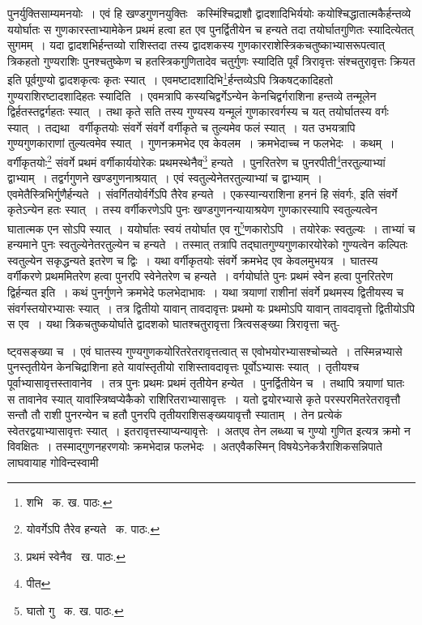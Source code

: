 \documentclass[11pt, openany]{book}
\begin{document}
{\noindent पुनर्युक्तिसाम्यमनयोः~। एवं हि खण्डगुणनयुक्तिः \textendash\ कस्मिंश्चिद्राशौ द्वादशादिभिर्ययोः कयोश्चिद्धातात्मकैर्हन्तव्ये ययोर्घातः स गुणकारस्ताभ्यामेकेन प्रथमं हत्वा हत एव पुनर्द्वितीयेन च हन्यते तदा तयोर्घातगुणितः स्यादित्येतत् सुगमम्~। यदा द्वादशभिर्हन्तव्यो राशिस्तदा तस्य द्वादशकस्य गुणकारराशेस्त्रिकचतुष्काभ्यासरूपत्वात् त्रिकहतो गुण्यराशिः पुनश्चतुष्केण च हतस्त्रिकगुणितादेव चतुर्गुणः स्यादिति पूर्वं त्रिरावृत्तः संश्चतुरावृत्तः क्रियत इति पूर्वगुण्यो द्वादशकृत्वः कृतः स्यात्~। एवमष्टादशादिभि\renewcommand{\thefootnote}{१}\footnote{शभि \textendash\ क. ख. पाठः.}र्हन्तव्येऽपि त्रिकषट्कादिहतो गुण्यराशिरष्टादशादिहतः स्यादिति~। एवमत्रापि कस्यचिद्वर्गेऽन्येन केनचिद्वर्गराशिना हन्तव्ये तन्मूलेन द्विर्हतस्तद्वर्गहतः स्यात्~। तथा कृते सति तस्य गुण्यस्य यन्मूलं गुणकारवर्गस्य च यत् तयोर्घातस्य वर्गः स्यात्~। तद्यथा \textendash\ वर्गीकृतयोः संवर्गे संवर्गे
वर्गीकृते च तुल्यमेव फलं स्यात्~। यत उभयत्रापि गुण्यगुणकाराणां तुल्यत्वमेव स्यात्~। गुणनक्रमभेद एव केवलम~। क्रमभेदाच्च न फलभेदः~। कथम्~। वर्गीकृतयोः\renewcommand{\thefootnote}{२}\footnote{योवर्गेऽपि तैरेव हन्यते \textendash\ क. पाठः.}   संवर्गे प्रथमं वर्गीकार्ययोरेकः प्रथमस्थेनैव\renewcommand{\thefootnote}{३}\footnote{प्रथमं स्वेनैव \textendash\ ख. पाठः.} हन्यते~। पुनरितरेण च पुनरपीती\renewcommand{\thefootnote}{४}\footnote{पीत}तरतुल्याभ्यां द्वाभ्याम्~। तद्वर्गगुणने खण्डगुणनाश्रयात्~। एवं स्वतुल्येनेतरतुल्याभ्यां च द्वाभ्याम्~। एवमेतैस्त्रिभिर्गुणैर्हन्यते~। संवर्गितयोर्वर्गेऽपि तैरेव हन्यते~। एकस्यान्यराशिना हननं हि संवर्गः, इति संवर्गे कृतेऽन्येन हतः स्यात्~। तस्य वर्गीकरणेऽपि पुनः खण्डगुणनन्यायाश्रयेण गुणकारस्यापि स्वतुल्यत्वेन घातात्मक एन सोऽपि स्यात्~। ययोर्घातः स्वयं तयोर्घात एव गु\renewcommand{\thefootnote}{५}\footnote{घातो गु \textendash\ क. ख. पाठः.}णकारोऽपि~। तयोरेकः स्वतुल्यः~। ताभ्यां च हन्यमाने पुनः स्वतुल्येनेतरतुल्येन च हन्यते~। तस्मात् तत्रापि तद्घातगुण्यगुणकारयोरेको गुण्यत्वेन कल्पितः स्वतुल्येन सकृद्धन्यते इतरेण च द्विः~। यथा वर्गीकृतयोः संवर्गे क्रमभेद एव केवलमुभयत्र~। घातस्य वर्गीकरणे प्रथममितरेण हत्वा पुनरपि स्वेनेतरेण च हन्यते~। वर्गयोर्घाते पुनः प्रथमं स्वेन हत्वा पुनरितरेण द्विर्हन्यत इति~। कथं पुनर्गुणने क्रमभेदे फलभेदाभावः~। यथा त्रयाणां राशीनां संवर्गे प्रथमस्य द्वितीयस्य च संवर्गस्तयोरभ्यासः स्यात्~। तत्र द्वितीयो यावान् तावदावृत्तः प्रथमो यः प्रथमोऽपि यावान् तावदावृत्तो द्वितीयोऽपि स एव~। यथा त्रिकचतुष्कयोर्घाते द्वादशको घातश्चतुरावृत्ता त्रित्वसङ्ख्या त्रिरावृत्ता चतु-

\newpage

\noindent ष्ट्वसङ्ख्या च~। एवं घातस्य गुण्यगुणकयोरितरेतरावृत्तत्वात् स एवोभयोरभ्यासश्चोच्यते~। तस्मिन्नभ्यासे पुनस्तृतीयेन केनचिद्राशिना हते यावांस्तृतीयो राशिस्तावदावृत्तः पूर्वोऽभ्यासः स्यात्~। तृतीयश्च पूर्वाभ्यासावृत्तस्तावानेव~। तत्र पुनः प्रथमः प्रथमं तृतीयेन हन्येत~।
पुनर्द्वितीयेन च~। तथापि त्रयाणां घातः स तावानेव स्यात् यावांस्त्रिष्वप्येकैको राशिरितराभ्यासावृत्तः~। यतो द्वयोरभ्यासे कृते परस्परमितरेतरावृत्तौ सन्तौ तौ राशी पुनरन्येन च हतौ पुनरपि तृतीयराशिसङ्ख्ययावृत्तौ स्याताम्~। तेन प्रत्येकं स्वेतरद्वयाभ्यासावृत्तः स्यात्~। इतरावृत्तस्याप्यन्यावृत्तेः~। अतएव {\qt तेन लब्ध्या च गुण्यो गुणित} इत्यत्र क्रमो न विवक्षितः~। तस्माद्गुणनहरणयोः क्रमभेदान्न फलभेदः~। अतएवैकस्मिन् विषयेऽनेकत्रैराशिकसन्निपाते लाघवायाह गोविन्दस्वामी\textendash 

}
\end{document}
